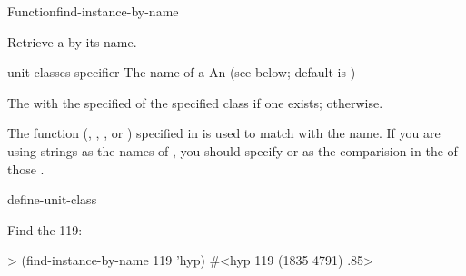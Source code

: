 \documentclass[10pt,twoside,english,pdftex]{article}
\begin{document}

\begin{functiondoc}{Function}{find-instance-by-name}{
      \returns{}
    } 
%
%
%

\fnsyntax

\fnpurpose Retrieve a  by its name.

\fnpackage {}

\fnmodule {}

\fnargs
\begin{args}{unit-classes-specifier}
\arg[name] The name of a 
 An 
(see below; default is )
\end{args}

\fnreturns The  with the specified  of
the specified class if one exists; \nil{} otherwise.

\fndsyntax
\unitclassspec
\subclassingspec

\fndescription The  function
(, , , or ) specified in
\textbf{} is used to match 
with the  name.  If you are using strings as the
names of , you should specify  or
 as the comparision  in the 
of those .

\begin{alsos}{define-unit-class}
\end{alsos}

\fnexample
Find the   119:
\begin{example}
> (find-instance-by-name 119 'hyp)
#<hyp 119 (1835 4791) .85>
\end{example}

\end{functiondoc}

\end{document}
